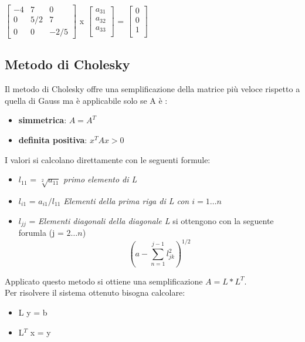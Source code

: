 \begin{center}
$
\begin{bmatrix}
-4 & 7 & 0 \\
0 & 5/2 & 7 \\
0 & 0 & -2/5 
\end{bmatrix}
$
x
$
\begin{bmatrix}
a_{31} \\
a_{32} \\
a_{33} \\
\end{bmatrix}
$
=
$
\begin{bmatrix}
0 \\
0 \\
1 \\
\end{bmatrix}
$
\end{center}

\subsection{Metodo di Cholesky}
\label{Metodo di Cholesky}
Il metodo di Cholesky offre una semplificazione della matrice più veloce rispetto a quella di Gauss ma è applicabile solo se A è :
\begin{itemize}
\item \textbf{simmetrica}: $A = A^T$
\item \textbf{definita positiva}: $x^T A x > 0$ 
\end{itemize}
\noindent
I valori si calcolano direttamente con le seguenti formule:
\begin{itemize}
\item $l_{11}$ = $\sqrt[2]{a_{11}}$ \quad \quad \textit{primo elemento di L}
\item $l_{i1}$ = $a_{i1}/ l_{11} $ \quad \quad \textit{Elementi della prima riga di L con $i = 1\dots n$}
\item $l_{jj}$ = \textit{Elementi diagonali della diagonale L} si ottengono con la seguente forumla (j = $2\dots n$) $$(a - \sum_{n=1}^{j-1} l^2_{jk})^{1/2}$$ 
\end{itemize}
Applicato questo metodo si ottiene una semplificazione $A = L * L^T$.
\\
Per risolvere il sistema ottenuto bisogna calcolare:
\begin{itemize}
\item L y = b
\item L$^T$ x = y
\end{itemize}

